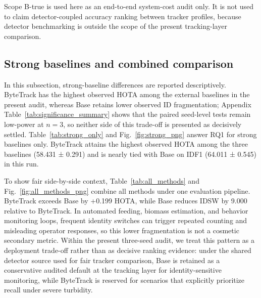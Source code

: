\documentclass[5p,twocolumn,a4paper]{elsarticle}
\newcommand{\CEAfitcoltable}[1]{%
\begingroup
\scriptsize
\setlength{\tabcolsep}{2.6pt}%
\renewcommand{\arraystretch}{1.04}%
\resizebox{\columnwidth}{!}{#1}%
\endgroup
}
\begin{document}
Scope B-true is used here as an end-to-end system-cost audit only. It is not used to claim detector-coupled accuracy ranking between tracker profiles, because detector benchmarking is outside the scope of the present tracking-layer comparison.

\begin{table}[t]
\centering
\caption{Core cumulative main-chain methods on val-half (mean±std).}
\label{tab:core_main}
\CEAfitcoltable{}
\end{table}


\subsection{Strong baselines and combined comparison}
In this subsection, strong-baseline differences are reported descriptively. ByteTrack has the highest observed HOTA among the external baselines in the present audit, whereas Base retains lower observed ID fragmentation; Appendix Table~\ref{tab:significance_summary} shows that the paired seed-level tests remain low-power at $n=3$, so neither side of this trade-off is presented as decisively settled.
Table~\ref{tab:strong_only} and Fig.~\ref{fig:strong_png} answer RQ1 for strong baselines only. ByteTrack attains the highest observed HOTA among the three baselines (58.431 ± 0.291) and is nearly tied with Base on IDF1 (64.011 ± 0.545) in this run.

To show fair side-by-side context, Table~\ref{tab:all_methods} and Fig.~\ref{fig:all_methods_png} combine all methods under one evaluation pipeline. ByteTrack exceeds Base by +0.199 HOTA, while Base reduces IDSW by 9.000 relative to ByteTrack. In automated feeding, biomass estimation, and behavior monitoring loops, frequent identity switches can trigger repeated counting and misleading operator responses, so this lower fragmentation is not a cosmetic secondary metric. Within the present three-seed audit, we treat this pattern as a deployment trade-off rather than as decisive ranking evidence: under the shared detector source used for fair tracker comparison, Base is retained as a conservative audited default at the tracking layer for identity-sensitive monitoring, while ByteTrack is reserved for scenarios that explicitly prioritize recall under severe turbidity.

\begin{table}[t]
\centering
\caption{Strong baseline methods (mean±std).}
\label{tab:strong_only}
\CEAfitcoltable{}
\end{table}
\end{document}
